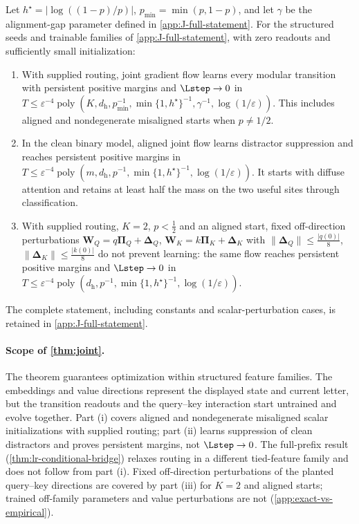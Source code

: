 \begin{theorem}
\label{thm:joint}
Let $h^\star=|\log((1-p)/p)|$, $p_{\min}=\min(p,1-p)$, and let $\gamma$
be the alignment-gap parameter defined in \cref{app:J-full-statement}.
For the structured seeds and trainable families of \cref{app:J-full-statement},
with zero readouts and sufficiently small initialization:
\begin{enumerate}[label=(\roman*),leftmargin=*,itemsep=0pt,topsep=2pt]
\item With supplied routing, joint gradient flow learns every modular transition
with persistent positive margins and $\Lstep\to0$ in
$T\le\varepsilon^{-4}\operatorname{poly}(K,d_{\mathrm h},p_{\min}^{-1},
\min\{1,h^\star\}^{-1},\gamma^{-1},\log(1/\varepsilon))$.
This includes aligned and nondegenerate misaligned starts when $p\ne1/2$.
\item In the clean binary model, aligned joint flow learns distractor suppression
and reaches persistent positive margins in
$T\le\varepsilon^{-4}\operatorname{poly}(m,d_{\mathrm h},p^{-1},
\min\{1,h^\star\}^{-1},\log(1/\varepsilon))$.
It starts with diffuse attention and retains at least half the mass on the two
useful sites through classification.
\item With supplied routing, $K=2$, $p<\tfrac12$ and an aligned start, fixed off-direction perturbations
$\mathbf W_Q=q\bm\Pi_Q+\bm\Delta_Q$, $\mathbf W_K=k\bm\Pi_K+\bm\Delta_K$ with $\|\bm\Delta_Q\|\le\frac{|q(0)|}8$,
$\|\bm\Delta_K\|\le\frac{|k(0)|}8$ do not prevent learning: the same flow reaches persistent positive margins and $\Lstep\to0$ in
$T\le\varepsilon^{-4}\operatorname{poly}(d_{\mathrm h},p^{-1},\min\{1,h^\star\}^{-1},\log(1/\varepsilon))$.
\end{enumerate}
The complete statement, including constants and scalar-perturbation cases,
is retained in \cref{app:J-full-statement}.
\end{theorem}

\paragraph{Scope of \cref{thm:joint}.} The theorem guarantees optimization within structured feature families. The embeddings and value
directions represent the displayed state and current letter, but the transition readouts and the query--key interaction start untrained
and evolve together. Part (i) covers aligned and nondegenerate misaligned scalar initializations with supplied routing; part (ii)
learns suppression of clean distractors and proves persistent margins, not $\Lstep\to0$. The full-prefix result
(\cref{thm:lr-conditional-bridge}) relaxes routing in a different tied-feature family and does not follow from part (i). Fixed
off-direction perturbations of the planted query--key directions are covered by part (iii) for $K=2$ and aligned starts; trained off-family
parameters and value perturbations are not (\cref{app:exact-vs-empirical}).

